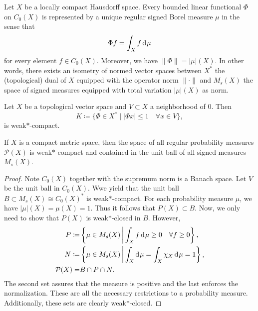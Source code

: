 \begin{thm}
  \label{thm:riesz-markow}
  Let \(X\) be a locally compact Hausdorff space. Every bounded linear functional \(\Phi\) on \(C_0(X)\) is represented by a unique regular signed Borel measure \(\mu\) in the sense that \[
    \Phi f = \int_X f \d\mu
  \]
  for every element \(f \in C_0(X)\). Moreover, we have \(\|\Phi\| = |\mu|(X)\). In other words, there exists an isometry of normed vector spaces between \(X^\ast\) the (topological) dual of \(X\) equipped with the operator norm \(\|\cdot \|\) and \(M_{s}(X)\) the space of signed measures equipped with total variation \(|\mu|(X)\) as norm.
\end{thm}

\begin{thm}
  Let \(X\) be a topological vector space and \(V \subset X\) a neighborhood of \(0\). Then
  \[
    K \coloneqq \{ \Phi \in X^\ast \mid |\Phi x| \leq 1 \quad \forall x \in V\},
  \]
  is weak\(\ast\)-compact.
\end{thm}

\begin{cor}
  \label{cor:banach-alaoglu}
  If \(X\) is a compact metric space, then the space of all regular probability measures \(\mathcal{P}(X)\) is weak\(\ast\)-compact and contained in the unit ball of all signed measures \(M_{s}(X)\).
\end{cor}

\begin{proof}
  Note \(C_0(X)\) together with the supremum norm is a Banach space. Let \(V\) be the unit ball in \(C_0(X)\). Wwe yield that the unit ball \(B \subset M_s(X) \cong C_0(X)^\ast\) is weak\(\ast\)-compact. For each probability measure \(\mu\), we have \(|\mu|(X) = \mu(X) = 1\). Thus it follows that \(P(X) \subset B\). Now, we only need to show that \(P(X)\) is weak\(\ast\)-closed in \(B\). However,
  \begin{align*}
    P \coloneqq & \left\{\mu \in M_s(X) \relmid \int_X f \d\mu \geq 0 \quad \forall f \geq 0\right\},\\
    N \coloneqq & \left\{\mu \in M_s(X) \relmid \int_X \d\mu = \int_X \chi_X \d\mu = 1\right\},\\
    \mathcal{P}(X)  = & B \cap P \cap N.
  \end{align*}
  The second set assures that the measure is positive and the last enforces the normalization. These are all the necessary restrictions to a probability measure. Additionally, these sets are clearly weak\(\ast\)-closed.
\end{proof}


